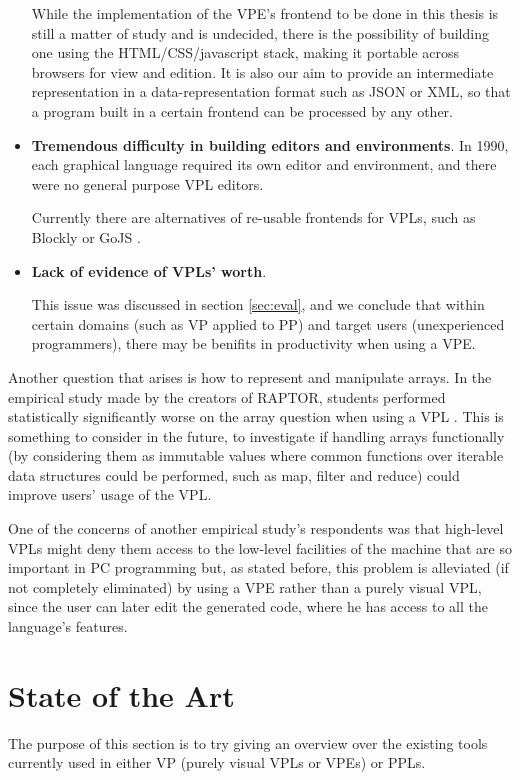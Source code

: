 \begin{itemsize}
\begin{itemize}
While the implementation of the VPE's frontend to be done in this thesis is still a matter
of study and is undecided, there is the possibility of building one using the
HTML/CSS/javascript stack, making it portable across browsers for view and edition.
It is also our aim to provide an intermediate representation in a data-representation
format such as JSON or XML, so that a program built in a certain frontend can
be processed by any other.
  \item \textbf{Tremendous difficulty in building editors and environments}.
In 1990, each graphical language required its own editor and environment, and there were no general purpose
VPL editors.

Currently there are alternatives of re-usable frontends for VPLs,
such as Blockly \cite{blockly} or GoJS \cite{gojs}.
  \item \textbf{Lack of evidence of VPLs' worth}.

This issue was discussed in section
\ref{sec:eval}, and we conclude that within certain domains (such as VP applied
to PP) and target users (unexperienced programmers), there may be benifits in
productivity when using a VPE.
\end{itemize}

Another question that arises is how to represent and manipulate arrays. In the
empirical study made by the creators of RAPTOR, students performed statistically
significantly worse on the array question when using a VPL \cite{Cardellini2002}.
This is something to consider in the future, to investigate if handling arrays
functionally (by considering them as immutable values where common functions over
iterable data structures could be performed, such as map, filter and reduce)
could improve users' usage of the VPL.

One of the concerns of another empirical study's respondents was that high-level VPLs might deny
them access to the low-level facilities of the machine that are so important in PC programming \cite{Whitley1997}
but, as stated before, this problem is alleviated (if not completely eliminated)
by using a VPE rather than a purely visual VPL, since the user can later
edit the generated code, where he has access to all the language's features.

\section{State of the Art}
\label{sec:art}

The purpose of this section is to try giving an overview over the existing tools
currently used in either VP (purely visual VPLs or VPEs) or PPLs.


\end{itemsize}
